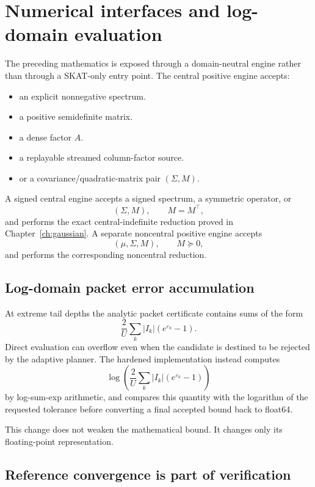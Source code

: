 \section{Numerical interfaces and log-domain evaluation}\label{sec:final-25}

The preceding mathematics is exposed through a domain-neutral engine rather
than through a SKAT-only entry point.  The central positive engine accepts:

\begin{itemize}
\item an explicit nonnegative spectrum.
\item a positive semidefinite matrix.
\item a dense factor \(A\).
\item a replayable streamed column-factor source.
\item or a covariance/quadratic-matrix pair
\((\Sigma,M)\).
\end{itemize}

A signed central engine accepts a signed spectrum, a symmetric operator, or
\[
(\Sigma,M),\qquad M=M^\top,
\]
and performs the exact central-indefinite reduction proved in Chapter~\ref{ch:gaussian}.  A
separate noncentral positive engine accepts
\[
(\mu,\Sigma,M),\qquad M\succeq0,
\]
and performs the corresponding noncentral reduction.

\subsection{Log-domain packet error accumulation}

At extreme tail depths the analytic packet certificate contains sums of the
form
\[
\frac{2}{U}
\sum_k
|I_k|
\left(
e^{\varepsilon_k}-1
\right).
\]
Direct evaluation can overflow even when the candidate is destined to be
rejected by the adaptive planner.  The hardened implementation instead
computes
\[
\log\left(
\frac{2}{U}
\sum_k
|I_k|
\left(
e^{\varepsilon_k}-1
\right)
\right)
\]
by log-sum-exp arithmetic, and compares this quantity with the logarithm of
the requested tolerance before converting a final accepted bound back to
float64.

This change does not weaken the mathematical bound. It changes only its
floating-point representation.

\subsection{Reference convergence is part of verification}

